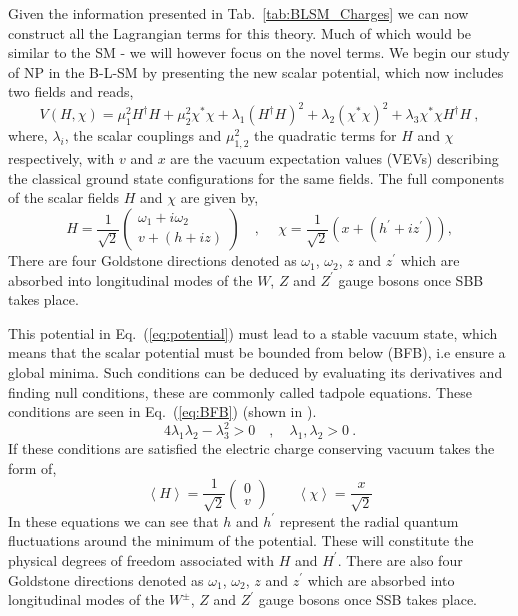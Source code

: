 \documentclass[10pt]{report}
\newcommand{\mean}[1]{\left \langle #1 \right \rangle }
\newcommand{\vevs}[0]{VEVs}
\begin{document}
Given the information presented in Tab.~\ref{tab:BLSM_Charges} we can now construct all the Lagrangian terms for this theory. Much of which would be similar to the SM - we will however focus on the novel terms. We begin our study of NP in the B-L-SM by presenting the new scalar potential, which now includes two fields and reads, 
%
\begin{equation}
\label{eq:potential}
V(H,\chi) = \mu_1^2 H^\dagger H + \mu_2^2 \chi^\ast \chi + \lambda_1 (H^\dagger H)^2 + \lambda_2 \left(\chi^\ast \chi\right)^2 + \lambda_3  \chi^\ast \chi H^\dagger H \ , 
\end{equation}
%
where,  $\lambda_i$, the scalar couplings and $\mu_{1,2}^2$ the quadratic terms for $H$ and $\chi$ respectively, with $v$ and $x$ are the vacuum expectation values (\vevs) describing the classical ground state configurations for the same fields. The full components of the scalar fields $H$ and $\chi$ are given by,
%
\begin{equation}
H = \frac{1}{\sqrt{2}} 
\begin{pmatrix}
 \omega_1 + i \omega_2  \\
v + (h + i z)
\end{pmatrix} \quad , ~\quad \chi = \frac{1}{\sqrt{2}} \left( x + \left(h^\prime + i z^\prime\right) \right) , 
\end{equation}
%
There are four Goldstone directions denoted as $\omega_1$, $\omega_2$, $z$ and $z^\prime$ which are absorbed into longitudinal modes of the $W$, $Z$ and $Z^\prime$ gauge bosons once SBB takes place.

This potential in Eq.~(\ref{eq:potential}) must lead to a stable vacuum state, which means that the scalar potential must be bounded from below (BFB), i.e ensure a global minima. Such conditions can be deduced by evaluating its derivatives and finding null conditions, these are commonly called tadpole equations. These conditions are seen in Eq.~(\ref{eq:BFB}) (shown in \cite{Basso:2010jm}).
%
\begin{equation}
4 \lambda_1 \lambda_2  -  \lambda_3^2 > 0 \quad , \quad \lambda_1 , \lambda_2>0 
\label{eq:BFB} \ .
\end{equation}
%
If these conditions are satisfied the electric charge conserving vacuum takes the form of,
\begin{equation}
\mean{H} = \dfrac{1}{\sqrt{2}} 
\begin{pmatrix}
0 \\
v 
\end{pmatrix}	
\qquad
\mean{\chi} = \dfrac{x}{\sqrt{2}}
\label{eq:vacuum}
\end{equation}
%
In these equations we can see that $h$ and $h^\prime$ represent the radial quantum fluctuations around the minimum of the potential.
%
These will constitute the physical degrees of freedom associated with $H$ and $H^\prime$. There are also four Goldstone directions denoted as $\omega_1$, $\omega_2$, $z$ and $z^\prime$ which are absorbed into longitudinal modes of the $W^\pm$, $Z$ and $Z^\prime$ gauge bosons once SSB takes place. 
 
\end{document}
